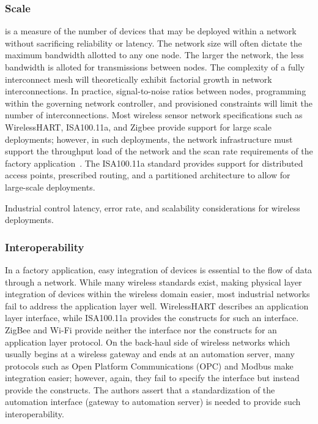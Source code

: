     \subsubsection{Scale} is a measure of the number of devices that may be deployed within a network without sacrificing reliability or latency. The network size will often dictate the maximum bandwidth allotted to any one node.  The larger the network, the less bandwidth is alloted for transmissions between nodes.  The complexity of a fully interconnect mesh will theoretically exhibit factorial growth in network interconnections.  In practice, signal-to-noise ratios between nodes, programming within the governing network controller, and provisioned constraints will limit the number of interconnections.  Most wireless sensor network specifications such as WirelessHART, ISA100.11a, and Zigbee provide support for large scale deployments; however, in such deployments, the network infrastructure must support the throughput load of the network and the scan rate requirements of the factory application~\cite{Wang7448365}.  The ISA100.11a standard provides support for distributed access points, prescribed routing, and a partitioned architecture to allow for large-scale deployments.

\begin{table}[!t]
	\centering
	\caption{Industrial control latency, error rate, and scalability considerations for wireless deployments.}
	\label{tbl:techreqs}
	
\end{table}%

    \subsubsection{Interoperability}
    In a factory application, easy integration of devices is essential to  the flow of data through a network. While many wireless standards exist, making physical layer integration of devices within the wireless domain easier, most industrial networks fail to address the application layer well.  WirelessHART describes an application layer interface, while ISA100.11a provides the constructs for such an interface.  ZigBee and Wi-Fi provide neither the interface nor the constructs for an application layer protocol. On the back-haul side of wireless networks which usually begins at a wireless gateway and ends at an automation server, many protocols such as Open Platform Communications (OPC) and Modbus make integration easier; however, again, they fail to specify the interface but instead provide the constructs.  The authors assert that a standardization of the automation interface (gateway to automation server) is needed to provide such interoperability. 
    
